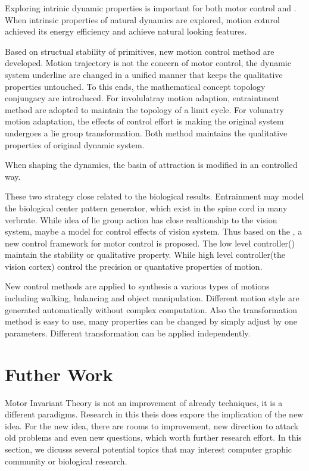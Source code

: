 Exploring intrinic dynamic properties is important for both motor control and \cms.
When  intrinsic properties of natural dynamics are explored, motion cotnrol achieved its energy efficiency and \cms achieve natural looking features.






Based on structual stability of primitives, new motion control method are developed.
Motion trajectory is not the concern of motor control, the dynamic system underline are changed in a unified manner that keeps the qualitative properties untouched.
To this ends, the mathematical concept topology conjungacy are introduced.
For involulatray motion adaption, entraintment method are adopted to maintain the topology of a limit cycle.
For volunatry motion adaptation, the effects of control effort is making the original system undergoes a lie group transformation.
Both method maintains the qualitative properties of original dynamic system.




When shaping the dynamics, the basin of attraction is modified in an controlled way.

These two strategy close related to  the biological results.
Entrainment may model the biological center pattern generator, which exist in the spine cord in many verbrate.
While idea of lie group action has close realtionship to the vision system, maybe a model for control effects of vision system.
Thus based on the , a new control framework for motor control is proposed.
The low level controller(\cpg) maintain the stability or qualitative property.
While high level controller(the vision cortex) control the precision or quantative properties of motion.


New control methods are applied to synthesis a various types of motions including walking, balancing and object manipulation.
Different motion style are generated automatically without complex computation.
Also the transformation method is easy to use, many properties can be changed by simply adjust by one parameters.
Different transformation can be applied independently.












 




\section{Futher Work}
Motor Invariant Theory is not an improvement of already \cms techniques, it is a different paradigms.
Research in this theis does expore the implication of the new idea.
For the new idea, there are rooms to improvement, new direction to attack old problems and even new questions,
which worth further research effort.
In this section, we dicusss several potential topics that may interest computer graphic community or biological research.


